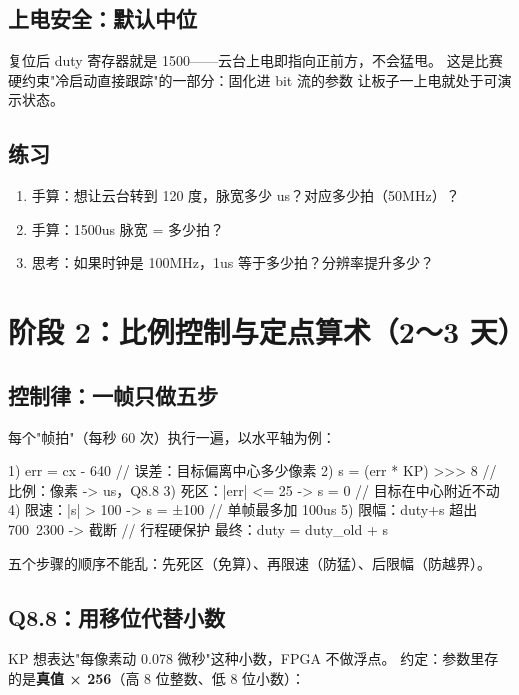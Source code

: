 \documentclass[11pt]{ctexart}
\begin{document}
\subsection{上电安全：默认中位}

复位后 duty 寄存器就是 1500——云台上电即指向正前方，不会猛甩。
这是比赛硬约束"冷启动直接跟踪"的一部分：固化进 bit 流的参数
让板子一上电就处于可演示状态。

\subsection{练习}

\begin{enumerate}
  \item 手算：想让云台转到 120 度，脉宽多少 us？对应多少拍（50MHz）？
  \item 手算：1500us 脉宽 = 多少拍？
  \item 思考：如果时钟是 100MHz，1us 等于多少拍？分辨率提升多少？
\end{enumerate}

\section{阶段 2：比例控制与定点算术（2～3 天）}

\subsection{控制律：一帧只做五步}

每个"帧拍"（每秒 60 次）执行一遍，以水平轴为例：

\begin{Verilog}
1) err  = cx - 640                    // 误差：目标偏离中心多少像素
2) s    = (err * KP) >>> 8            // 比例：像素 -> us，Q8.8
3) 死区：|err| <= 25  ->  s = 0        // 目标在中心附近不动
4) 限速：|s| > 100    ->  s = ±100     // 单帧最多加 100us
5) 限幅：duty+s 超出 700~2300 -> 截断   // 行程硬保护
最终：duty = duty_old + s
\end{Verilog}

五个步骤的顺序不能乱：先死区（免算）、再限速（防猛）、后限幅（防越界）。

\subsection{Q8.8：用移位代替小数}

KP 想表达"每像素动 0.078 微秒"这种小数，FPGA 不做浮点。
约定：参数里存的是\textbf{真值 × 256}（高 8 位整数、低 8 位小数）：
\end{document}
